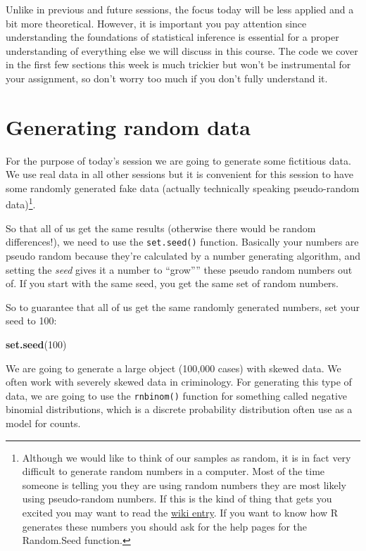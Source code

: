 \documentclass[
]{book}
\newenvironment{Shaded}{\begin{snugshade}}{\end{snugshade}}
\newcommand{\DecValTok}[1]{\textcolor[rgb]{0.00,0.00,0.81}{#1}}
\newcommand{\FunctionTok}[1]{\textcolor[rgb]{0.13,0.29,0.53}{\textbf{#1}}}
\newcommand{\NormalTok}[1]{#1}
\begin{document}
Unlike in previous and future sessions, the focus today will be less applied and a bit more theoretical. However, it is important you pay attention since understanding the foundations of statistical inference is essential for a proper understanding of everything else we will discuss in this course. The code we cover in the first few sections this week is much trickier but won't be instrumental for your assignment, so don't worry too much if you don't fully understand it.

\section{Generating random data}\label{generating-random-data}

For the purpose of today's session we are going to generate some fictitious data. We use real data in all other sessions but it is convenient for this session to have some randomly generated fake data (actually technically speaking pseudo-random data)\footnote{Although we would like to think of our samples as random, it is in fact very difficult to generate random numbers in a computer. Most of the time someone is telling you they are using random numbers they are most likely using pseudo-random numbers. If this is the kind of thing that gets you excited you may want to read the \href{http://en.wikipedia.org/wiki/Random_number_generation\#.22True.22_random_numbers_vs._pseudo-random_numbers}{wiki entry}. If you want to know how R generates these numbers you should ask for the help pages for the Random.Seed function.}.

So that all of us get the same results (otherwise there would be random differences!), we need to use the \texttt{set.seed()} function. Basically your numbers are pseudo random because they're calculated by a number generating algorithm, and setting the \emph{seed} gives it a number to ``grow'''' these pseudo random numbers out of. If you start with the same seed, you get the same set of random numbers.

So to guarantee that all of us get the same randomly generated numbers, set your seed to 100:

\begin{Shaded}
\begin{Highlighting}[]
\FunctionTok{set.seed}\NormalTok{(}\DecValTok{100}\NormalTok{) }
\end{Highlighting}
\end{Shaded}

We are going to generate a large object (100,000 cases) with skewed data. We often work with severely skewed data in criminology. For generating this type of data, we are going to use the \texttt{rnbinom()} function for something called negative binomial distributions, which is a discrete probability distribution often use as a model for counts.
\end{document}

